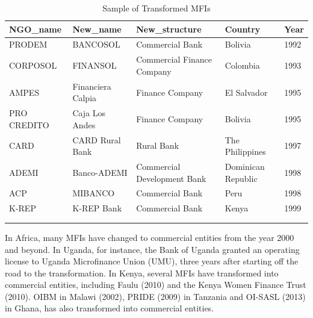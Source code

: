 \documentclass[a4paper,nobind]{templates/ociamthesis}
\begin{document}
\begin{table}

\caption{\label{tab:unnamed-chunk-3}Sample of Transformed MFIs}
\centering
\fontsize{8}{10}\selectfont
\begin{tabu} to 
\toprule
NGO\_name & New\_name & New\_structure & Country & Year\\
\midrule
PRODEM & BANCOSOL & Commercial Bank & Bolivia & 1992\\
CORPOSOL & FINANSOL & Commercial Finance Company & Colombia & 1993\\
AMPES & Financiera Calpia & Finance Company & El Salvador & 1995\\
PRO CREDITO & Caja Los Andes & Finance Company & Bolivia & 1995\\
CARD & CARD Rural Bank & Rural Bank & The Philippines & 1997\\
\addlinespace
ADEMI & Banco-ADEMI & Commercial Development Bank & Dominican Republic & 1998\\
ACP & MIBANCO & Commercial Bank & Peru & 1998\\
K-REP & K-REP Bank & Commercial Bank & Kenya & 1999\\
\bottomrule
{}\\
\\
\end{tabu}
\end{table}

In Africa, many MFIs have changed to commercial entities from the year 2000 and beyond. In Uganda, for instance, the Bank of Uganda granted an operating license to Uganda Microfinance Union (UMU), three years after starting off the road to the transformation. In Kenya, several MFIs have transformed into commercial entities, including Faulu (2010) and the Kenya Women Finance Trust (2010). OIBM in Malawi (2002), PRIDE (2009) in Tanzania and OI-SASL (2013) in Ghana, has also transformed into commercial entities.
\end{document}
